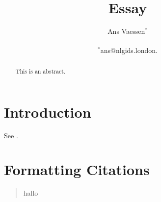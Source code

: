 \documentclass[12pt]{article}
\title{Essay}
\author
{Ans Vaessen$^{\ast}$\\
\\
\normalsize{$^{\ast}$ans@nlgids.london.}\\
}
\date{}
\begin{document}
 
\maketitle 

\begin{abstract}
This is an abstract.
\end{abstract}

\section*{Introduction}

See \cite{Christensen97}.

\section{Formatting Citations}

\begin{quote}
hallo
\end{quote}

{}
\end{document}
